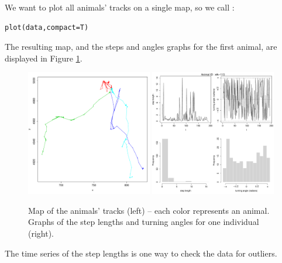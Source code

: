 \documentclass[]{article}
\begin{document}
\noindent We want to plot all animals' tracks on a single map, so we call :

\begin{lstlisting}
plot(data,compact=T)
\end{lstlisting}

The resulting map, and the steps and angles graphs for the first animal, are displayed in Figure \ref{moveData}.

\begin{figure}[h]
	\includegraphics[width=0.49\textwidth]{pictures/map_moveData}
	\includegraphics[width=0.49\textwidth]{pictures/graphs_elk1}
	\caption{Map of the animals' tracks (left) -- each color represents an animal. Graphs of the step lengths and turning angles for one individual (right).}
	\label{moveData}
\end{figure}

The time series of the step lengths is one way to check the data for outliers.
\end{document}
